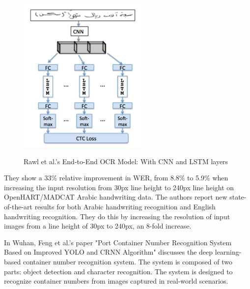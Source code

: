 \begin{figure}[ht]
    \centering
    \includegraphics[width=0.58\textwidth]{Figures/CRNN_Papers/Rawl_2018.jpg}
    \caption[Rawl et al.'s End-to-End OCR Model: With CNN and LSTM layers]{Rawl et al.'s End-to-End OCR Model: With CNN and LSTM layers}\cite{rawlsHowEfficientlyIncrease2018}
    \label{fig:Rawl et al.'s End-to-End OCR Model: With CNN and LSTM layers}
\end{figure}


They show a 33\% relative improvement in WER, from 8.8\% to 5.9\% when increasing the input resolution from 30px line height to 240px line height on OpenHART/MADCAT Arabic handwriting data. The authors report new state-of-the-art results for both Arabic handwriting recognition and English handwriting recognition. They do this by increasing the resolution of input images from a line height of 30px to 240px, an 8-fold increase.\cite{rawlsHowEfficientlyIncrease2018}


In Wuhan, Feng et al.'s paper "Port Container Number Recognition System Based on Improved YOLO and CRNN Algorithm" discusses the deep learning-based container number recognition system. The system is composed of two parts: object detection and character recognition. The system is designed to recognize container numbers from images captured in real-world scenarios.


